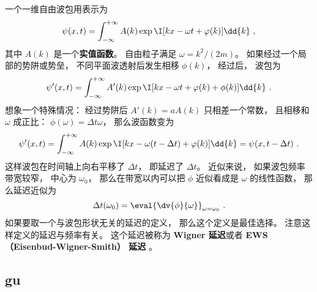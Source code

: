 
\begin{issues}
\issueDraft
\end{issues}

一个一维自由波包用表示为
\begin{equation}\label{eq_tDelay_3}
\psi(x, t) = \int_{-\infty}^{+\infty} A(k) \exp \I[ kx - \omega t + \varphi(k)] \dd{k}~,
\end{equation}
其中 $A(k)$ 是一个\textbf{实值函数}。 自由粒子满足 $\omega = k^2/(2m)$。 如果经过一个局部的势阱或势垒， 不同平面波透射后发生相移 $\phi(k)$， 经过后， 波包为
\begin{equation}\label{eq_tDelay_1}
\psi'(x, t) = \int_{-\infty}^{+\infty} A'(k) \exp \I[kx - \omega t + \varphi(k) + \phi(k)] \dd{k}~.
\end{equation}
想象一个特殊情况： 经过势阱后 $A'(k) = a A(k)$ 只相差一个常数， 且相移和 $\omega$ 成正比： $\phi(\omega) = \Delta t \omega$， 那么波函数变为
\begin{equation}
\psi'(x, t) = \int_{-\infty}^{+\infty} A(k) \exp \I[kx - \omega (t - \Delta t) + \varphi(k)] \dd{k}
= \psi(x, t - \Delta t)~.
\end{equation}
这样波包在时间轴上向右平移了 $\Delta t$， 即延迟了 $\Delta t$。 近似来说， 如果波包频率带宽较窄， 中心为 $\omega_0$， 那么在带宽以内可以把 $\phi$ 近似看成是 $\omega$ 的线性函数， 那么延迟近似为
\begin{equation}\label{eq_tDelay_2}
\Delta t(\omega_0) = \eval{\dv{\phi}{\omega}}_{\omega = \omega_0}~.
\end{equation}
如果要取一个与波包形状无关的延迟的定义， 那么这个定义是最佳选择。 注意这样定义的延迟与频率有关。 这个延迟被称为 \textbf{Wigner 延迟}或者 \textbf{EWS （Eisenbud-Wigner-Smith） 延迟} 。

\subsection{gu}

